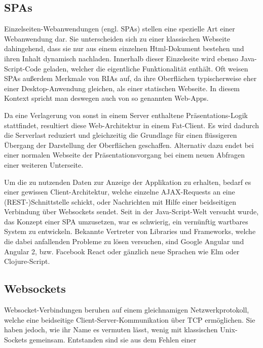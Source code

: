 \subsection{\aclp{SPA}}
Einzelseiten-Webanwendungen (engl. \aclp{SPA}) stellen eine spezielle Art einer Webanwendung dar.
Sie unterscheiden sich zu einer klassischen Webseite dahingehend, dass sie nur aus einem einzelnen Html-Dokument bestehen und ihren Inhalt dynamisch nachladen.
Innerhalb dieser Einzelseite wird ebenso Java-Script-Code geladen, welcher die eigentliche Funktionalität enthält.
Oft weisen \acp{SPA} außerdem Merkmale von \acp{RIA} auf, da ihre Oberflächen typischerweise eher einer Desktop-Anwendung gleichen, als einer statischen Webseite. In diesem Kontext spricht man deswegen auch von so genannten Web-Apps.
\par
Da eine Verlagerung von sonst in einem Server enthaltene Präsentations-Logik stattfindet, resultiert diese Web-Architektur in einem Fat-Client.
Es wird dadurch die Serverlast reduziert und gleichzeitig die Grundlage für einen flüssigeren Übergang der Darstellung der Oberflächen geschaffen.
Alternativ dazu endet bei einer normalen Webseite der Präsentationsvorgang bei einem neuen Abfragen einer weiteren Unterseite.
\par
Um die zu nutzenden Daten zur Anzeige der Applikation zu erhalten, bedarf es einer gewissen Client-Architektur, welche einzelne \acs{AJAX}-Requests an eine (\acs{REST}-)Schnittstelle schickt, oder Nachrichten mit Hilfe einer beidseitigen Verbindung über Websockets sendet.
Seit in der Java-Script-Welt versucht wurde, das Konzept einer \ac{SPA} umzusetzen, war es schwierig, ein vernünftig wartbares System zu entwickeln.
Bekannte Vertreter von Libraries und Frameworks, welche die dabei anfallenden Probleme zu lösen versuchen, sind Google Angular und Angular 2, \ac{bzw.} Facebook React oder gänzlich neue Sprachen wie Elm oder Clojure-Script.
\subsection{Websockets}
Websocket-Verbindungen beruhen auf einem gleichnamigen Netzwerkprotokoll, welche eine beidseitige Client-Server-Kommunikation über \acs{TCP} ermöglichen.
Sie haben jedoch, wie ihr Name es vermuten lässt, wenig mit klassischen Unix-Sockets gemeinsam.
Entstanden sind sie aus dem Fehlen einer 
